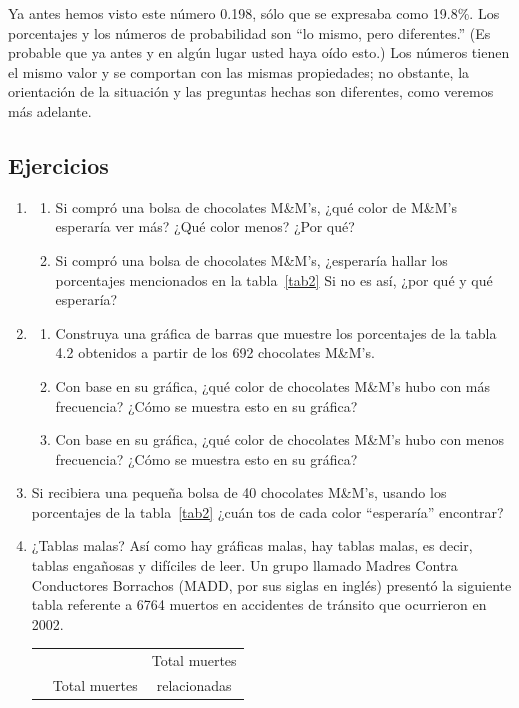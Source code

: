 \documentclass[10pt,twoside]{article}
\begin{document}
Ya antes hemos visto este número 0.198, sólo que se expresaba como 19.8\%.
Los porcentajes y los números de probabilidad son “lo mismo, pero diferentes.” (Es
probable que ya antes y en algún lugar usted haya oído esto.) Los números tienen
el mismo valor y se comportan con las mismas propiedades; no obstante, la orientación de la situación y las preguntas hechas son diferentes, como veremos más adelante.
\subsection*{Ejercicios}
\begin{enumerate}
\item 
\begin{enumerate}
\item Si compró una bolsa de chocolates M\&M’s, ¿qué color de M\&M’s esperaría ver más? ¿Qué color menos? ¿Por qué? 
\item Si compró una bolsa de chocolates M\&M’s, ¿esperaría hallar los porcentajes mencionados en la tabla~\ref{tab2} Si no es así, ¿por qué y qué esperaría? 
\end{enumerate}
\item
\begin{enumerate}
\item Construya una gráfica de barras que muestre los porcentajes de la tabla 4.2 obtenidos a
partir de los 692 chocolates M\&M’s.
\item Con base en su gráfica, ¿qué color de chocolates M\&M’s hubo con más frecuencia?
¿Cómo se muestra esto en su gráfica?
\item Con base en su gráfica, ¿qué color de chocolates M\&M’s hubo con menos frecuencia?
¿Cómo se muestra esto en su gráfica?
\end{enumerate}
\item Si recibiera una pequeña bolsa de 40 chocolates M\&M’s, usando los porcentajes de la tabla~\ref{tab2} ¿cuán   tos de cada color “esperaría” encontrar?
\item ¿Tablas malas? Así como hay gráficas malas, hay tablas malas, es decir, tablas engañosas y difíciles de leer. Un grupo llamado  Madres Contra Conductores Borrachos (MADD, por sus siglas en inglés) presentó la siguiente tabla referente a 6764 muertos en accidentes de tránsito que ocurrieron en 2002.
\begin{center}
\begin{tabular}{lcc}
 &  & Total muertes \\ 
 & Total muertes & relacionadas \\ 

\end{tabular}
\end{center}
\end{enumerate}
\end{document}
